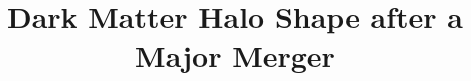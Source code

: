 \documentclass[linenumbers,trackchanges]{aastex7}
\begin{document}
\title{Dark Matter Halo Shape after a Major Merger}

\end{document}
